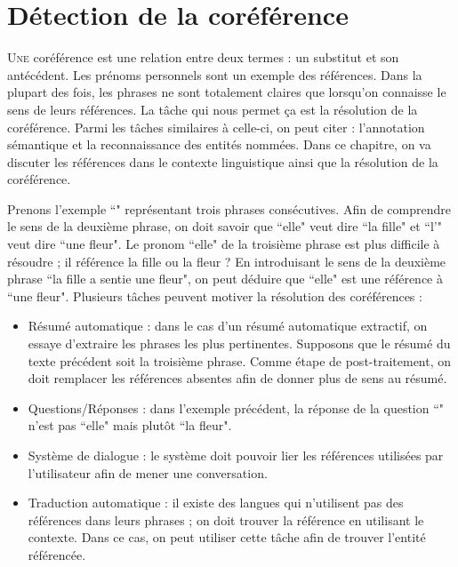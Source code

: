 \documentclass{KodeBook}
\begin{document}
		\mainmatter
	
\fi
\chapter{Détection de la coréférence}

\begin{introduction}
	\lettrine{U}{ne} coréférence est une relation entre deux termes : un substitut et son antécédent.
	Les prénoms personnels sont un exemple des références. 
	Dans la plupart des fois, les phrases ne sont totalement claires que lorsqu'on connaisse le sens de leurs références. 
	La tâche qui nous permet ça est la résolution de la coréférence. 
	Parmi les tâches similaires à celle-ci, on peut citer : l'annotation sémantique et la reconnaissance des entités nommées. 
	Dans ce chapitre, on va discuter les références dans le contexte linguistique ainsi que la résolution de la coréférence.
\end{introduction} 


Prenons l'exemple ``" représentant trois phrases consécutives.
Afin de comprendre le sens de la deuxième phrase, on doit savoir que ``elle" veut dire ``la fille" et ``l'" veut dire ``une fleur". 
Le pronom ``elle" de la troisième phrase est plus difficile à résoudre ; il référence la fille ou la fleur ?
En introduisant le sens de la deuxième phrase ``la fille a sentie une fleur", on peut déduire que ``elle" est une référence à ``une fleur".
Plusieurs tâches peuvent motiver la résolution des coréférences :
\begin{itemize}
	\item Résumé automatique : dans le cas d'un résumé automatique extractif, on essaye d'extraire les phrases les plus pertinentes. 
	Supposons que le résumé du texte précédent soit la troisième phrase.
	Comme étape de post-traitement, on doit remplacer les références absentes afin de donner plus de sens au résumé.
	\item Questions/Réponses : dans l'exemple précédent, la réponse de la question ``" n'est pas ``elle" mais plutôt ``la fleur".
	\item Système de dialogue : le système doit pouvoir lier les références utilisées par l'utilisateur afin de mener une conversation. 
	\item Traduction automatique : il existe des langues qui n'utilisent pas des références dans leurs phrases ; on doit trouver la référence en utilisant le contexte. 
	Dans ce cas, on peut utiliser cette tâche afin de trouver l'entité référencée.
\end{itemize}
\end{document}
